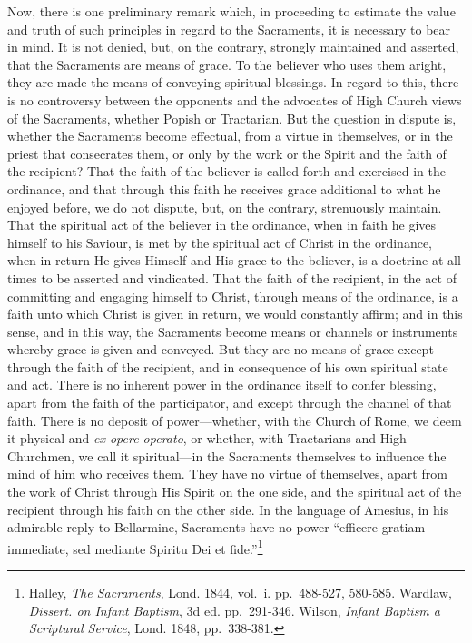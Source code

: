 \documentclass[]{book}
\begin{document}
Now, there is one preliminary remark which, in proceeding to estimate the value and truth of such principles in regard to the Sacraments, it is necessary to bear in mind. It is not denied, but, on the contrary, strongly maintained and asserted, that the Sacraments are means of grace. To the believer who uses them aright, they are made the means of conveying spiritual blessings. In regard to this, there is no controversy between the opponents and the advocates of High Church views of the Sacraments, whether Popish or Tractarian. But the question in dispute is, whether the Sacraments become effectual, from a virtue in themselves, or in the priest that consecrates them, or only by the work or the Spirit and the faith of the recipient? That the faith of the believer is called forth and exercised in the ordinance, and that through this faith he receives grace additional to what he enjoyed before, we do not dispute, but, on the contrary, strenuously maintain. That the spiritual act of the believer in the ordinance, when in faith he gives himself to his Saviour, is met by the spiritual act of Christ in the ordinance, when in return He gives Himself and His grace to the believer, is a doctrine at all times to be asserted and vindicated. That the faith of the recipient, in the act of committing and engaging himself to Christ, through means of the ordinance, is a faith unto which Christ is given in return, we would constantly affirm; and in this sense, and in this way, the Sacraments become means or channels or instruments whereby grace is given and conveyed. But they are no means of grace except through the faith of the recipient, and in consequence of his own spiritual state and act. There is no inherent power in the ordinance itself to confer blessing, apart from the faith of the participator, and except through the channel of that faith. There is no deposit of power---whether, with the Church of Rome, we deem it physical and \emph{ex opere operato}, or whether, with Tractarians and High Churchmen, we call it spiritual---in the Sacraments themselves to influence the mind of him who receives them. They have no virtue of themselves, apart from the work of Christ through His Spirit on the one side, and the spiritual act of the recipient through his faith on the other side. In the language of Amesius, in his admirable reply to Bellarmine, Sacraments have no power ``efficere gratiam immediate, sed mediante Spiritu Dei et fide.''\footnote{Halley, \emph{The Sacraments}, Lond. 1844, vol.~i. pp.~488-527, 580-585. Wardlaw, \emph{Dissert. on Infant Baptism}, 3d ed. pp.~291-346. Wilson, \emph{Infant Baptism a Scriptural Service}, Lond. 1848, pp.~338-381.}
\end{document}

